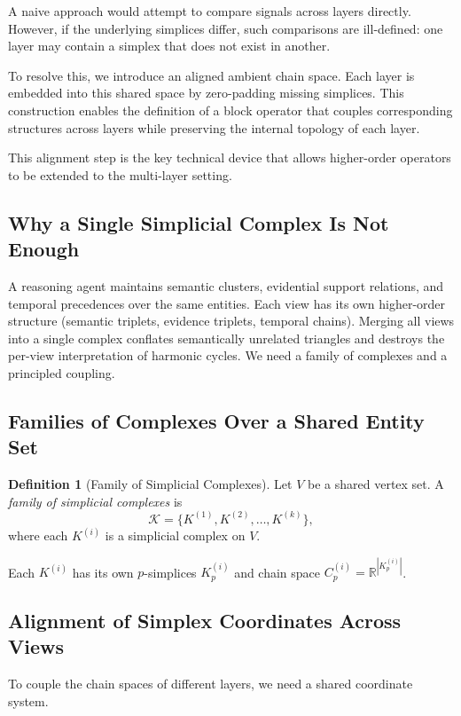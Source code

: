 \documentclass[11pt]{article}
\theoremstyle{definition}
\newtheorem{definition}[theorem]{Definition}
\theoremstyle{remark}
\newcommand{\R}{\mathbb{R}}
\newcommand{\calK}{\mathcal{K}}
\begin{document}
A naive approach would attempt to compare signals across layers directly. However, if the underlying simplices differ, such comparisons are ill-defined: one layer may contain a simplex that does not exist in another.

To resolve this, we introduce an aligned ambient chain space. Each layer is embedded into this shared space by zero-padding missing simplices. This construction enables the definition of a block operator that couples corresponding structures across layers while preserving the internal topology of each layer.

This alignment step is the key technical device that allows higher-order operators to be extended to the multi-layer setting.

\subsection{Why a Single Simplicial Complex Is Not Enough}

A reasoning agent maintains semantic clusters, evidential support relations, and
temporal precedences over the same entities. Each view has its own higher-order
structure (semantic triplets, evidence triplets, temporal chains). Merging all
views into a single complex conflates semantically unrelated triangles and
destroys the per-view interpretation of harmonic cycles. We need a family of
complexes and a principled coupling.

\subsection{Families of Complexes Over a Shared Entity Set}

\begin{definition}[Family of Simplicial Complexes]
Let $V$ be a shared vertex set. A \emph{family of simplicial complexes} is
\[
  \calK = \{K^{(1)}, K^{(2)}, \dots, K^{(k)}\},
\]
where each $K^{(i)}$ is a simplicial complex on $V$.
\end{definition}

Each $K^{(i)}$ has its own $p$-simplices $K_p^{(i)}$ and chain space
$C_p^{(i)} = \R^{|K_p^{(i)}|}$.

\subsection{Alignment of Simplex Coordinates Across Views}

To couple the chain spaces of different layers, we need a shared coordinate
system.
\end{document}
